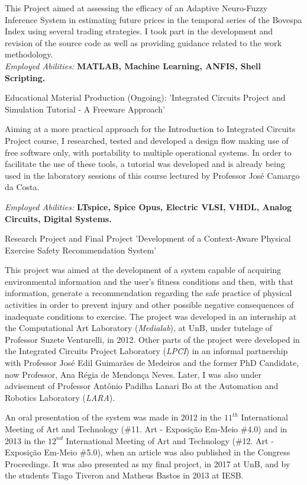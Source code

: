 \documentclass[a4paper]{twentysecondcv} %
\begin{document}
\begin{twenty}
{This Project aimed at assessing the efficacy of an Adaptive Neuro-Fuzzy Inference System in estimating future prices in the temporal series of the Bovespa Index using several trading strategies. I took part in the development and revision of the source code as well as providing guidance related to the work methodology.\\
\textit{Employed Abilities:} \textbf{MATLAB, Machine Learning, ANFIS, Shell Scripting.\\}}

\twentyitem
{Educational Material Production (Ongoing):}
{'Integrated Circuits Project and Simulation Tutorial - A Freeware Approach'}
{}
{\hspace{8pt} Aiming at a more practical approach for the Introduction to Integrated Circuits Project course, I researched, tested and developed a design flow making use of free software only, with portability to multiple operational systems. In order to facilitate the use of these tools, a tutorial was developed and is already being used in the laboratory sessions of this course lectured by Professor José Camargo da Costa.

\hspace{8pt}\textit{Employed Abilities:} \textbf{LTspice, Spice Opus, Electric VLSI, VHDL, Analog Circuits, Digital Systems.\\}}

\twentyitem
{Research Project and Final Project}
{'Development of a Context-Aware Physical Exercise Safety Recommendation System'}
{}
{\hspace{8pt}This project was aimed at the development of a system capable of acquiring environmental information and the user's fitness conditions and then, with that information, generate a recommendation regarding the safe practice of physical activities in order to prevent injury and other possible negative consequences of inadequate conditions to exercise. The project was developed in an internship at the Computational Art Laboratory (\textit{Medialab}), at UnB, under tutelage of Professor Suzete Venturelli, in 2012. Other parts of the project were developed in the Integrated Circuits Project Laboratory (\textit{LPCI}) in an informal partnership with Professor José Edil Guimarães de Medeiros and the former PhD Candidate, now Professor, Ana Régia de Mendonça Neves. Later, I was also under advisement of Professor Antônio Padilha Lanari Bo at the Automation and Robotics Laboratory (\textit{LARA}).

\hspace{8pt}An oral presentation of the system was made in 2012 in the $11^{th}$ International Meeting of Art and Technology (\#11. Art - Exposição Em-Meio \#4.0) and in 2013 in the $12^{nd}$ International Meeting of Art and Technology (\#12. Art - Exposição Em-Meio \#5.0), when an article was also published in the Congress Proceedings. It was also presented as my final project, in 2017 at UnB, and by the students Tiago Tiveron and Matheus Bastos in 2013 at IESB.

}
\end{twenty}
\end{document}
